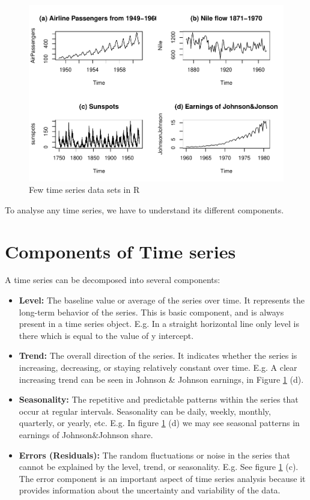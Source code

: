 \documentclass[
]{book}
\providecommand{\tightlist}{%
  \setlength{\itemsep}{0pt}\setlength{\parskip}{0pt}}
\begin{document}
\begin{figure}

{\centering \includegraphics{DauR_files/figure-latex/tsex-1} 

}

\caption{Few time series data sets in R}\label{fig:tsex}
\end{figure}

To analyse any time series, we have to understand its different components.

\hypertarget{components-of-time-series}{%
\section{Components of Time series}\label{components-of-time-series}}

A time series can be decomposed into several components:

\begin{itemize}
\tightlist
\item
  \textbf{Level:} The baseline value or average of the series over time. It represents the long-term behavior of the series. This is basic component, and is always present in a time series object. E.g. In a straight horizontal line only level is there which is equal to the value of y intercept.
\item
  \textbf{Trend:} The overall direction of the series. It indicates whether the series is increasing, decreasing, or staying relatively constant over time. E.g. A clear increasing trend can be seen in Johnson \& Johnson earnings, in Figure \ref{fig:tsex} (d).
\item
  \textbf{Seasonality:} The repetitive and predictable patterns within the series that occur at regular intervals. Seasonality can be daily, weekly, monthly, quarterly, or yearly, etc. E.g. In figure \ref{fig:tsex} (d) we may see seasonal patterns in earnings of Johnson\&Johnson share.
\item
  \textbf{Errors (Residuals):} The random fluctuations or noise in the series that cannot be explained by the level, trend, or seasonality. E.g. See figure \ref{fig:tsex} (c). The error component is an important aspect of time series analysis because it provides information about the uncertainty and variability of the data.
\end{itemize}
\end{document}
